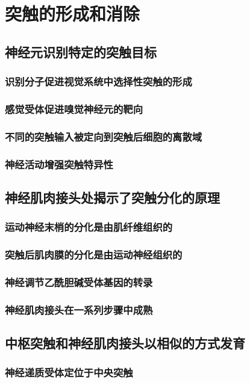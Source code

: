 \chapter{突触的形成和消除}


\section{神经元识别特定的突触目标}
\subsection{识别分子促进视觉系统中选择性突触的形成}
\subsection{感觉受体促进嗅觉神经元的靶向}
\subsection{不同的突触输入被定向到突触后细胞的离散域}
\subsection{神经活动增强突触特异性}

\section{神经肌肉接头处揭示了突触分化的原理}
\subsection{运动神经末梢的分化是由肌纤维组织的}
\subsection{突触后肌肉膜的分化是由运动神经组织的}
\subsection{神经调节乙酰胆碱受体基因的转录}
\subsection{神经肌肉接头在一系列步骤中成熟}

\section{中枢突触和神经肌肉接头以相似的方式发育}
\subsection{神经递质受体定位于中央突触}

